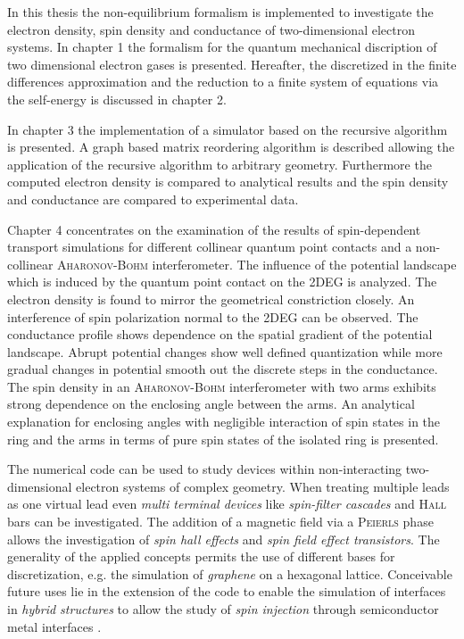 In this thesis the non-equilibrium \gfnc{} formalism is implemented to investigate the electron density, spin density and conductance of two-dimensional electron systems. In chapter 1 the \gfnc{} formalism for the quantum mechanical discription of two dimensional electron gases is presented. Hereafter, the discretized \hamil{} in the finite differences approximation and the reduction to a finite system of equations via the self-energy is discussed in chapter 2.\par
In chapter 3 the implementation of a simulator based on the recursive \gfnc{} algorithm is presented. A graph based matrix reordering algorithm is described allowing the application of the recursive \gfnc{} algorithm to arbitrary geometry.
Furthermore the computed electron density is compared to analytical results and the spin density and conductance are compared to experimental data.\par
Chapter 4 concentrates on the examination of the results of spin-dependent transport simulations for different collinear quantum point contacts and a non-collinear \textsc{Aharonov-Bohm} interferometer. The influence of the potential landscape which is induced by the quantum point contact on the 2DEG is analyzed.
The electron density is found to mirror the geometrical constriction closely. An interference of spin polarization normal to the 2DEG can be observed. The conductance profile shows dependence on the spatial gradient of the potential landscape. Abrupt potential changes show well defined quantization while more gradual changes in potential smooth out the discrete steps in the conductance.
The spin density in an \textsc{Aharonov-Bohm} interferometer with two arms exhibits strong dependence on the enclosing angle between the arms. An analytical explanation for enclosing angles with negligible interaction of spin states in the ring and the arms in terms of pure spin states of the isolated ring is presented.\par
The numerical code can be used to study devices within non-interacting two-dimensional electron systems of complex geometry. When treating multiple leads as one virtual lead even \emph{multi terminal devices} like \emph{spin-filter cascades} \cite{jacob:093714} and \textsc{Hall} bars \cite{Wunderlich24122010} can be investigated. The addition of a magnetic field via a \textsc{Peierls} phase allows the investigation of \emph{spin hall effects} and \emph{spin field effect transistors}. The generality of the applied concepts permits the use of different bases for discretization, e.g. the simulation of \emph{graphene} on a hexagonal lattice. Conceivable future uses lie in the extension of the code to enable the simulation of interfaces in \emph{hybrid structures} to allow the study of \emph{spin injection} through semiconductor metal interfaces \cite{holz:431}.
